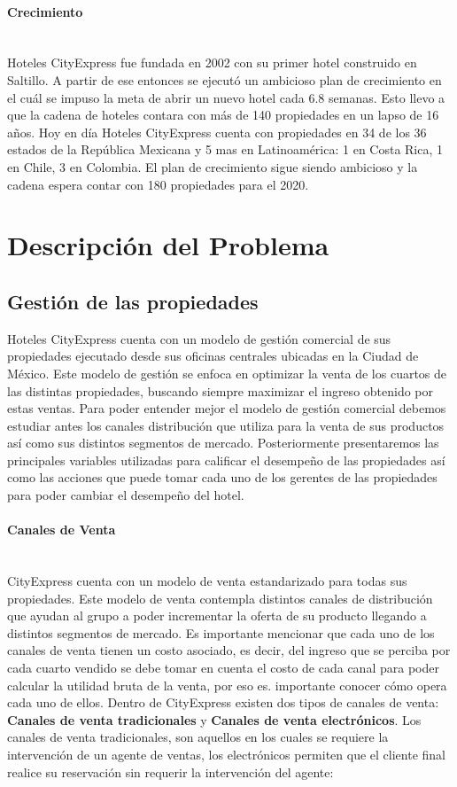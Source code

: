 \documentclass[a4paper,11pt]{article}
\begin{document}
\paragraph {Crecimiento} ~ \\
Hoteles CityExpress fue fundada en 2002 con su primer hotel construido en Saltillo. A partir de ese entonces se ejecutó un ambicioso plan de crecimiento en el cuál se impuso la meta de abrir un nuevo hotel cada 6.8 semanas. Esto llevo a que la cadena de hoteles contara con más de 140 propiedades en un lapso de 16 años.
Hoy en día Hoteles CityExpress cuenta con propiedades en 34 de los 36 estados de la República Mexicana y 5 mas en Latinoamérica: 1 en Costa Rica, 1 en Chile, 3 en Colombia. El plan de crecimiento sigue siendo ambicioso y la cadena espera contar con 180 propiedades para el 2020.
\section{Descripción del Problema}
\subsection{Gestión de las propiedades}
Hoteles CityExpress cuenta con un modelo de gestión comercial de sus propiedades ejecutado desde sus oficinas centrales ubicadas en la Ciudad de México. Este modelo de gestión se enfoca en optimizar la venta de los cuartos de las distintas propiedades, buscando siempre maximizar el ingreso obtenido por estas ventas.
Para poder entender mejor el modelo de gestión comercial debemos estudiar antes los canales distribución que utiliza para la venta de sus productos así como sus distintos segmentos de mercado. Posteriormente presentaremos las principales variables utilizadas para calificar el desempeño de las propiedades así como las acciones que puede tomar cada uno de los gerentes de las propiedades para poder cambiar el desempeño del hotel.
\paragraph{Canales de Venta} ~\\
CityExpress cuenta con un modelo de venta estandarizado para todas sus propiedades. Este modelo de venta contempla distintos canales de distribución que ayudan al grupo a poder incrementar la oferta de su producto llegando a distintos segmentos de mercado.
Es importante mencionar que cada uno de los canales de venta tienen un costo asociado, es decir, del ingreso que se perciba por cada cuarto vendido se debe tomar en cuenta el costo de cada canal para poder calcular la utilidad bruta de la venta, por eso es. importante conocer cómo opera cada uno de ellos.
Dentro de CityExpress existen dos tipos de canales de venta: \textbf{Canales de venta tradicionales} y \textbf{Canales de venta electrónicos}. Los canales de venta tradicionales, son aquellos en los cuales se requiere la intervención de un agente de ventas, los electrónicos permiten que el cliente final realice su reservación sin requerir la intervención del agente:
\end{document}
